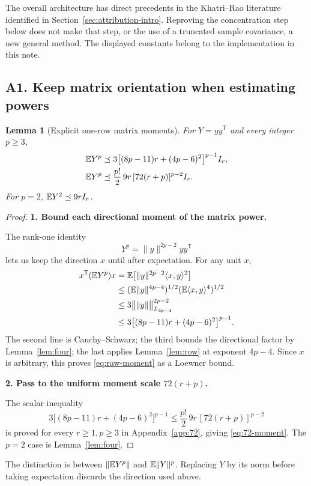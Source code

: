 \documentclass[11pt]{article}
\numberwithin{equation}{section}
\newtheorem{lemma}[theorem]{Lemma}
\theoremstyle{definition}\newtheorem{definition}[theorem]{Definition}
\theoremstyle{remark}\newtheorem{remark}[theorem]{Remark}
\newcommand{\norm}[1]{\lVert#1\rVert}\newcommand{\ip}[2]{\langle#1,#2\rangle}
\newcommand{\step}[1]{\par\addvspace{.65\baselineskip}\Needspace{4\baselineskip}\noindent\textbf{#1}\par\nobreak\smallskip}
\begin{document}
The overall architecture has direct precedents in the Khatri--Rao literature
identified in Section~\ref{sec:attribution-intro}. Reproving the concentration
step below does not make that step, or the use of a truncated sample covariance,
a new general method. The displayed constants belong to the implementation in
this note.

\subsection{A1. Keep matrix orientation when estimating powers}
\begin{lemma}[Explicit one-row matrix moments]\label{lem:raw-moments}
For $Y=yy^{\mathsf T}$ and every integer $p\ge3$,
\begin{align}
 \mathbb E Y^p
 &\preceq 3\bigl[(8p-11)r+(4p-6)^2\bigr]^{p-1}I_r,\label{eq:raw-moment}\\
 \mathbb E Y^p
 &\preceq\frac{p!}{2}\,9r\,[72(r+p)]^{p-2}I_r.\label{eq:72-moment}
\end{align}
For $p=2$, $\mathbb E Y^2\preceq9rI_r$.
\end{lemma}
\begin{proof}
\step{1. Bound each directional moment of the matrix power.}
The rank-one identity
\[
 Y^p=\norm y^{2p-2}yy^{\mathsf T}
\]
lets us keep the direction $x$ until after expectation. For any unit $x$,
\begin{align*}
 x^{\mathsf T}(\E Y^p)x
 &=\E\bigl[\norm y^{2p-2}\ip{x}{y}^2\bigr]\\
 &\le(\E\norm y^{4p-4})^{1/2}(\E\ip{x}{y}^4)^{1/2}\\
 &\le3\bigl\|\norm y\bigr\|_{L_{4p-4}}^{2p-2}\\
 &\le3\bigl[(8p-11)r+(4p-6)^2\bigr]^{p-1}.
\end{align*}
The second line is Cauchy--Schwarz; the third bounds the directional factor by
Lemma~\ref{lem:four}; the last applies Lemma~\ref{lem:row} at exponent $4p-4$.
Since $x$ is arbitrary, this proves \eqref{eq:raw-moment} as a Loewner bound.

\step{2. Pass to the uniform moment scale $72(r+p)$.}
The scalar inequality
\begin{equation}\label{eq:72-scalar}
 3\bigl[(8p-11)r+(4p-6)^2\bigr]^{p-1}
 \le\frac{p!}{2}\,9r\,[72(r+p)]^{p-2}
\end{equation}
is proved for every $r\ge1,p\ge3$ in Appendix~\ref{app:72}, giving
\eqref{eq:72-moment}. The $p=2$ case is Lemma~\ref{lem:four}.
\end{proof}
The distinction is between $\norm{\E Y^p}$ and $\E\norm{Y}^p$.
Replacing $Y$ by its norm before taking expectation discards the direction used above.
\end{document}
